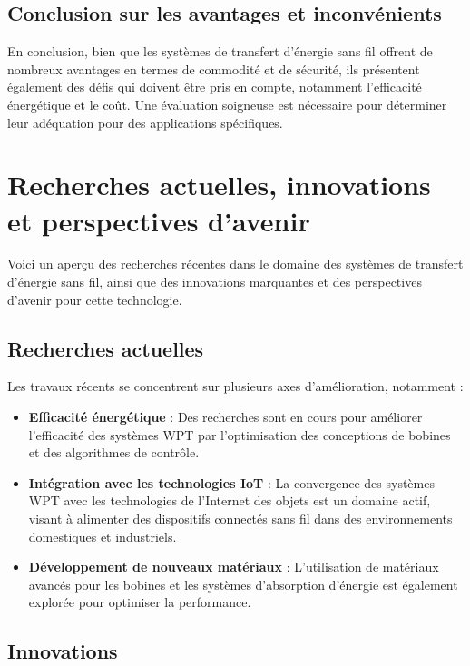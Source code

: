 \documentclass[12pt,a4paper,titlepage,notitlepage]{article}
\begin{document}
	\subsection{Conclusion sur les avantages et inconvénients}
	
	En conclusion, bien que les systèmes de transfert d'énergie sans fil offrent de nombreux avantages en termes de commodité et de sécurité, ils présentent également des défis qui doivent être pris en compte, notamment l'efficacité énergétique et le coût. Une évaluation soigneuse est nécessaire pour déterminer leur adéquation pour des applications spécifiques.
	
	\section{Recherches actuelles, innovations et perspectives d'avenir}
	
	Voici un aperçu des recherches récentes dans le domaine des systèmes de transfert d'énergie sans fil, ainsi que des innovations marquantes et des perspectives d'avenir pour cette technologie.
	
	\subsection{Recherches actuelles}
	
	Les travaux récents se concentrent sur plusieurs axes d'amélioration, notamment :
	\begin{itemize}
		\item \textbf{Efficacité énergétique} : Des recherches sont en cours pour améliorer l'efficacité des systèmes WPT par l'optimisation des conceptions de bobines et des algorithmes de contrôle.
		\item \textbf{Intégration avec les technologies IoT} : La convergence des systèmes WPT avec les technologies de l'Internet des objets est un domaine actif, visant à alimenter des dispositifs connectés sans fil dans des environnements domestiques et industriels.
		\item \textbf{Développement de nouveaux matériaux} : L'utilisation de matériaux avancés pour les bobines et les systèmes d'absorption d'énergie est également explorée pour optimiser la performance.
	\end{itemize}
	
	\subsection{Innovations}
	
\end{document}
